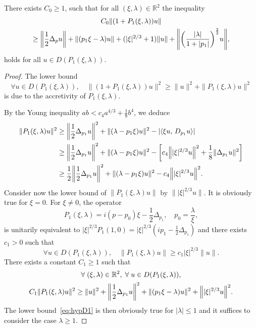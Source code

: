 \documentclass[10pt]{amsart}
\theoremstyle{definition}\newtheorem{defi}[theo]{Definition}\newtheorem{rema}[theo]{Remark}\newtheorem{exam}[theo]{Example}\newtheorem{exem}[theo]{Example}\newtheorem{nota}[theo]{Notation}
\newcommand{\R}{\mathbb{R}}
\let\oldforall\forall
\renewcommand*{\forall}{\mathrel{\oldforall}}
\let\originalleft\left
\let\originalright\right
\renewcommand{\left}{\mathopen{}\mathclose\bgroup\originalleft}
\renewcommand{\right}{\aftergroup\egroup\originalright}
\begin{document}
\begin{prop}\label{eq:EstimateOn1DComplexAiryOperator}
There exists $C_{0}\geq 1$, such that for all $(\xi,\lambda)\in \R^{2}$ the inequality
\begin{multline}\label{eq:hypD1}
C_{0}\|(1+P_{1}(\xi,\lambda))u\|\\
\geq \left\|\frac{1}{2}\Delta_{p}u\right\|+\|(p_{1}\xi-\lambda)u\|+(|\xi|^{2/3}+1)\|u\|+\left\|
\left(
\frac{|\lambda|}{1+|p_{1}|}
\right)^{\frac{2}{3}}u\right\|,
\end{multline}
holds for all $u\in D(P_{1}(\xi,\lambda))$.
\end{prop}
\begin{proof}
The lower bound
\[
\forall u\in D(P_{1}(\xi,\lambda)),\quad
\|(1+P_{1}(\xi,\lambda))u\|^{2}\geq \|u\|^{2}+\|P_{1}(\xi,\lambda)u\|^{2}
\]
is due to the accretivity of $P_{1}(\xi,\lambda)$.

By the Young inequality $ab<c_{4}a^{4/3}+\frac{1}{8}b^{4}$, we deduce
\begin{align*}
\|P_{1}(\xi,\lambda)u\|^{2}&\geq \left\|\frac{1}{2}\Delta_{p_{1}}u\right\|^{2}+\|(\lambda-p_{1}\xi)u\|^{2}-|\langle \xi u,\, D_{p_{1}}u\rangle|
\\
&\geq \left\|\frac{1}{2}\Delta_{p_{1}}u\right\|^{2}+\|(\lambda-p_{1}\xi)u\|^{2}-\left[c_4\left\||\xi|^{2/3}u\right\|^2+\frac{1}{8}\|\Delta_{p_1}u\|^2\right]
\\
&\geq \frac{1}{2}\left\|\frac{1}{2}\Delta_{p_{1}}u\right\|^{2}+\|(\lambda-p_{1}\xi)u\|^{2}-c_{4}\left\||\xi|^{2/3}u\right\|^{2}.
\end{align*}
Consider now the lower bound of $\|P_{1}(\xi,\lambda)u\|$ by $\||\xi|^{2/3}u\|$. It is obviously true for $\xi=0$. For $\xi\neq 0$, the operator
\[
P_{1}(\xi,\lambda)=i(p-p_{0})\xi-\frac{1}{2}\Delta_{p_{1}},\quad p_{0}=\frac{\lambda}{\xi},
\]
is unitarily equivalent to $|\xi|^{2/3}P_{1}(1,0)=|\xi|^{2/3}(ip_{1}-\frac{1}{2}\Delta_{p_{1}})$ and there exists $c_{1}>0$ such that
\[
\forall u\in D(P_1(\xi,\lambda)), \quad \|P_{1}(\xi,\lambda)u\|\geq c_{1}|\xi|^{2/3}\|u\|.
\]
There exists a constant $C_{1}\geq 1$ such that
\begin{multline*}
\forall (\xi,\lambda)\in \R^{2},\;\forall u\in D(P_{1}(\xi,\lambda)),\\
C_{1}\|P_{1}(\xi,\lambda)u\|^{2}\geq \|u\|^{2}+\left\|\frac{1}{2}\Delta_{p_{1}}u\right\|^{2}+\|(p_{1}\xi-\lambda)u\|^{2}+\left\||\xi|^{2/3}u\right\|^{2}.
\end{multline*}
The lower bound~\eqref{eq:hypD1} is then obviously true for $|\lambda|\leq 1$ and it suffices to consider the case $\lambda\geq 1$.


\end{proof}
\end{document}
